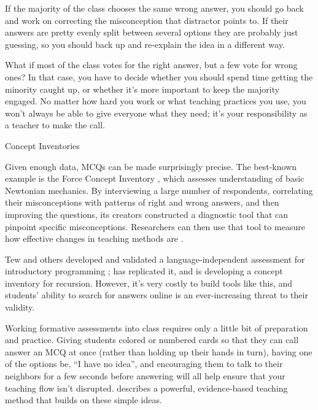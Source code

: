 If the majority of the class chooses the same wrong answer, you should
go back and work on correcting the misconception that distractor
points to.  If their answers are pretty evenly split between several
options they are probably just guessing, so you should back up and
re-explain the idea in a different way.

What if most of the class votes for the right answer, but a few vote
for wrong ones?  In that case, you have to decide whether you should
spend time getting the minority caught up, or whether it's more
important to keep the majority engaged.  No matter how hard you work
or what teaching practices you use, you won't always be able to give
everyone what they need; it's your responsibility as a teacher to make
the call.

\begin{callout}{Concept Inventories}

  Given enough data, MCQs can be made surprisingly precise. The
  best-known example is the Force Concept Inventory \cite{Hest1992},
  which assesses understanding of basic Newtonian mechanics. By
  interviewing a large number of respondents, correlating their
  misconceptions with patterns of right and wrong answers, and then
  improving the questions, its creators constructed a diagnostic tool
  that can pinpoint specific misconceptions.  Researchers can then use
  that tool to measure how effective changes in teaching methods are
  \cite{Hake1998}.

  Tew and others developed and validated a language-independent
  assessment for introductory programming \cite{Tew2011};
  \cite{Park2016} has replicated it, and \cite{Hamo2017} is developing
  a concept inventory for recursion. However, it's very costly to
  build tools like this, and students' ability to search for answers
  online is an ever-increasing threat to their validity.

\end{callout}

Working formative assessments into class requires only a little bit of
preparation and practice.  Giving students colored or numbered cards
so that they can call answer an MCQ at once (rather than holding up
their hands in turn), having one of the options be, ``I have no
idea'', and encouraging them to talk to their neighbors for a few
seconds before answering will all help ensure that your teaching flow
isn't disrupted.   describes a powerful,
evidence-based teaching method that builds on these simple ideas.

